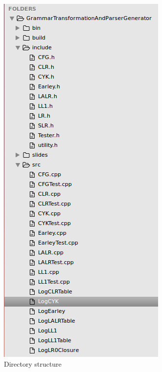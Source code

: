 \documentclass{beamer}
\begin{document}
   \begin{frame}
\begin{figure}
\includegraphics[height=0.8\textheight]{dir.png}
\caption{Directory structure}
\label{fig: dir}
\end{figure}
 \end{frame}
\end{document}
